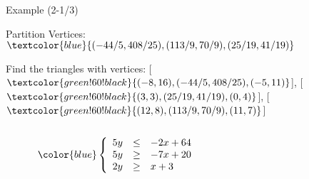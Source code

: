 \begin{frame}{Example (2-1/3)}
	\begin{block}{Partition}
		Vertices: $\textcolor{blue}{(-44/5,408/25),(113/9,70/9),(25/19,41/19)}$
		
		Find the triangles with vertices: [$\textcolor{green!60!black}{(-8,16),(-44/5,408/25),(-5,11)}$],
		[$\textcolor{green!60!black}{(3,3),(25/19,41/19),(0,4)}$],
		[$\textcolor{green!60!black}{(12,8),(113/9,70/9),(11,7)}$]
		\begin{columns}
			\begin{column}{0.2\textwidth}
				\begin{center}
					\begin{equation*}
						\color{blue}
						\left\{   \begin{array}{crl}
							5y &\le& -2x + 64\\ 
							5y &\ge& -7x + 20\\
							2y &\ge& x + 3
							
						\end{array}
						\right.
					\end{equation*}
					
				\end{center}
				
			\end{column}
			\hfill
			\begin{column}{0.8\textwidth}
				\begin{center}
					\begin{figure}[H]
						\scalebox{.7}{}
					\end{figure}
				\end{center}
			\end{column}
		\end{columns}
		
	\end{block}
	
	
\end{frame}
